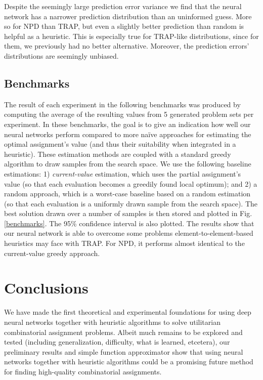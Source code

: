 \documentclass[runningheads]{llncs}
\begin{document}
	Despite the seemingly large prediction error variance we find that the neural network has a narrower prediction distribution than an uninformed guess. More so for NPD than TRAP, but even a slightly better prediction than random is helpful as a heuristic. This is especially true for TRAP-like distributions, since for them, we previously had no better alternative. Moreover, the prediction errors' distributions are seemingly unbiased.
	

	


	
		\subsection{Benchmarks}
	
		The result of each experiment in the following benchmarks was produced by computing the average of the resulting values from 5 generated problem sets per experiment. In these benchmarks, the goal is to give an indication how well our neural networks perform compared to more naïve approaches for estimating the optimal assignment's value (and thus their suitability when integrated in a heuristic). These estimation methods are coupled with a standard greedy algorithm to draw samples from the search space. We use the following baseline estimations: 1) \textit{current-value} estimation, which uses the partial assignment's value (so that each evaluation becomes a greedily found local optimum); and 2) a random approach, which is a worst-case baseline based on a random estimation (so that each evaluation is a uniformly drawn sample from the search space). The best solution drawn over a number of samples is then stored and plotted in Fig. \ref{benchmarks}. The 95\% confidence interval is also plotted.  The results show that our neural network is able to overcome some problems element-to-element-based heuristics may face with TRAP. For NPD, it performs almost identical to the current-value greedy approach. 
	

	
	\section{Conclusions}
	We have made the first theoretical and experimental foundations for using deep neural networks together with heuristic algorithms to solve utilitarian combinatorial assignment problems. Albeit much remains to be explored and tested (including generalization, difficulty, what is learned, etcetera), our preliminary results and simple function approximator show that using neural networks together with heuristic algorithms could be a promising future method for finding high-quality combinatorial assignments. 
	
\end{document}
